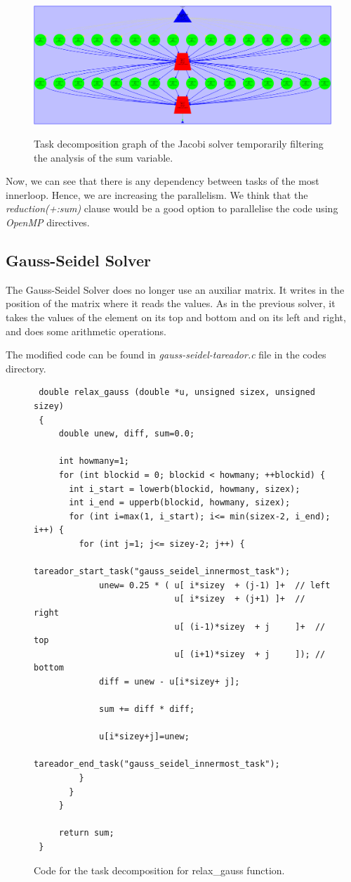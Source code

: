 \documentclass[12pt, a4paper]{article}
\begin{document}
\begin{figure}[H]
	\centering
	\includegraphics[scale=0.35]{./images/tareador-jacobi-2b}
	\label{fig:TDGJacobi-disable-sum}
	\caption{Task decomposition graph of the Jacobi solver temporarily filtering the analysis of the sum variable.}
\end{figure}

Now, we can see that there is any dependency between tasks of the most innerloop. Hence, we are increasing the parallelism. We think that the \textit{reduction(+:sum)} clause would be a good option to parallelise the code using \textit{OpenMP} directives.

\subsection{Gauss-Seidel Solver}

The Gauss-Seidel Solver does no longer use an auxiliar matrix. It writes in the position of the matrix where it reads the values. As in the previous solver, it takes the values of the element on its top and bottom and on its left and right, and does some arithmetic operations.

The modified code can be found in \textit{gauss-seidel-tareador.c} file in the codes directory.

\begin{figure}[H]
\begin{lstlisting}
 double relax_gauss (double *u, unsigned sizex, unsigned sizey)
 {
     double unew, diff, sum=0.0; 
 
     int howmany=1;
     for (int blockid = 0; blockid < howmany; ++blockid) {
       int i_start = lowerb(blockid, howmany, sizex);
       int i_end = upperb(blockid, howmany, sizex);
       for (int i=max(1, i_start); i<= min(sizex-2, i_end); i++) {
         for (int j=1; j<= sizey-2; j++) { 
			 tareador_start_task("gauss_seidel_innermost_task");
			 unew= 0.25 * ( u[ i*sizey	+ (j-1) ]+  // left
		 		   		    u[ i*sizey	+ (j+1) ]+  // right
				   		    u[ (i-1)*sizey	+ j     ]+  // top
				   		    u[ (i+1)*sizey	+ j     ]); // bottom
			 diff = unew - u[i*sizey+ j];
			
			 sum += diff * diff; 
			
		 	 u[i*sizey+j]=unew;
			 tareador_end_task("gauss_seidel_innermost_task");
         }
       }
     }

     return sum;
 }
\end{lstlisting}
\label{code:tareador-gauss-seidel}
\caption{Code for the task decomposition for relax\_gauss function.}
\end{figure}
\end{document}
